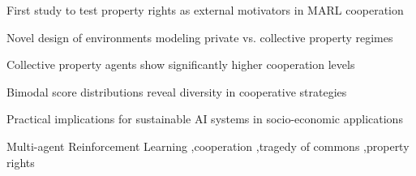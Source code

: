 \documentclass[preprint,12pt,authoryear]{elsarticle}
\begin{document}
\begin{frontmatter}
\begin{abstract}
This article investigates the impact of property rights as external motivators behind the emergence of co-operative behaviour between Multi-agent Reinforcement Learning agents in a tragedy of the commons setting. Training and evaluation environments are specifically designed to incorporate collective and private property rights. The agents are evaluated in homogeneous and heterogeneous scenarios. Conclusions are drawn based on statistical analysis of the results, and behaviours are examined on the basis of videos generated. The results indicate that agents trained in a collective environment are more likely to co-operate, while agents trained in a private environment display more selfish behaviour. A basis is provided for further research into the external motivators influencing the emergence of co-operation between MARL agents in various socio-economic settings.
\end{abstract}

\begin{highlights}
\item First study to test property rights as external motivators in MARL cooperation
\item Novel design of environments modeling private vs. collective property regimes
\item Collective property agents show significantly higher cooperation levels 
\item Bimodal score distributions reveal diversity in cooperative strategies
\item Practical implications for sustainable AI systems in socio-economic applications

\end{highlights}

\begin{keyword}
Multi-agent Reinforcement Learning \sep cooperation \sep tragedy of commons \sep property rights


\end{keyword}

\end{frontmatter}
\end{document}
